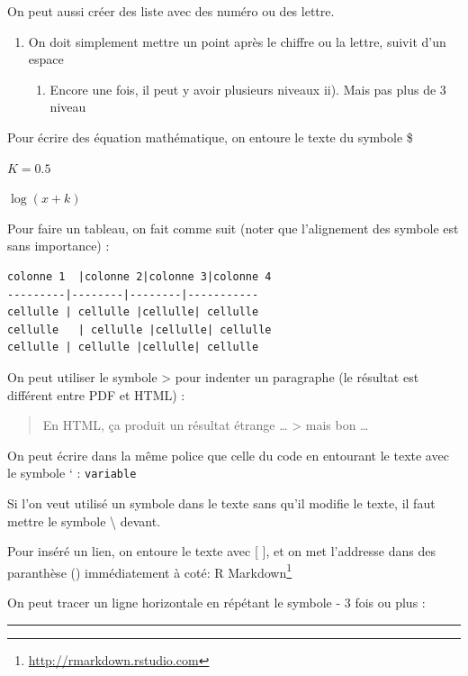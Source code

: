 \documentclass[12pt,]{book}
\providecommand{\tightlist}{%
  \setlength{\itemsep}{0pt}\setlength{\parskip}{0pt}}
\renewcommand{\href}[2]{#2\footnote{\url{#1}}}
\begin{document}
On peut aussi créer des liste avec des numéro ou des lettre.

\begin{enumerate}
\def\labelenumi{\arabic{enumi}.}
\tightlist
\item
  On doit simplement mettre un point après le chiffre ou la lettre, suivit d'un espace

  \begin{enumerate}
  \def\labelenumii{\alph{enumii}.}
  \tightlist
  \item
    Encore une fois, il peut y avoir plusieurs niveaux
    ii). Mais pas plus de 3 niveau
  \end{enumerate}
\end{enumerate}

Pour écrire des équation mathématique, on entoure le texte du symbole \$

\(K = 0.5\)

\(\log(x + k)\)

Pour faire un tableau, on fait comme suit (noter que l'alignement des symbole est sans importance) :

\begin{verbatim}
colonne 1  |colonne 2|colonne 3|colonne 4
---------|--------|--------|-----------
cellulle | cellulle |cellulle| cellulle
cellulle   | cellulle |cellulle| cellulle
cellulle | cellulle |cellulle| cellulle
\end{verbatim}

On peut utiliser le symbole \textgreater{} pour indenter un paragraphe (le résultat est différent entre PDF et HTML) :

\begin{quote}
En HTML, ça produit un résultat étrange \ldots{}
\textgreater{} mais bon \ldots{}
\end{quote}

On peut écrire dans la même police que celle du code en entourant le texte avec le symbole ` :
\texttt{variable}

Si l'on veut utilisé un symbole dans le texte sans qu'il modifie le texte, il faut mettre le symbole \textbackslash{} devant.

Pour inséré un lien, on entoure le texte avec {[} {]}, et on met l'addresse dans des paranthèse () immédiatement à coté:
\href{http://rmarkdown.rstudio.com}{R Markdown}

On peut tracer un ligne horizontale en répétant le symbole - 3 fois ou plus :

\begin{center}\rule{0.5\linewidth}{0.5pt}\end{center}
\end{document}
